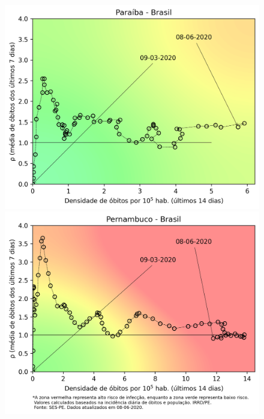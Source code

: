 \documentclass[]{article}
\begin{document}
\begin{figure}[!h]
	\begin{minipage}[t]{4cm}
		\centering
		\includegraphics[scale=0.5]{../PB.png}
	\end{minipage}
	\hspace{5cm}
	\begin{minipage}[t]{4cm}
		\centering
		\includegraphics[scale=0.5]{../PE.png}
		\vspace{0.2cm}
	\end{minipage}
\end{figure}
\newpage
\end{document}

